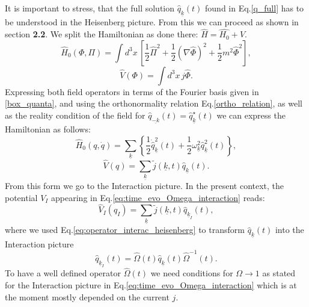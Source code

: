 \documentclass[12pt, titlepage]{article}
\begin{document}
It is important to stress, that the full solution $  \hat{q}_{\underline{k}}(t) 
 $ found in Eq.\enskip\eqref{q_full} has to be understood in the Heisenberg picture.
 From this we can proceed as shown in section \textbf{2.2}.  
We split the Hamiltonian as done there: $ \hat{H}= \hat{H_0} +V $. 
\begin{equation}
\hat{H}_{0}({\Phi},{\Pi})=
\int d^{3}x 
\,
\left[ 
\frac{1}{2}\hat{\Pi}^{2} + \frac{1}{2}(\nabla \hat{ \Phi})^{2} 
+\frac{1}{2}m^{2}\hat{\Phi}^{2}
\right] 
,
\end{equation}
\begin{equation}
\hat{V}(\Phi)=
\int d^{3}x 
\,
j\hat{\Phi}
.
\end{equation}
Expressing both field operators in terms of the Fourier basis given in \eqref{box_quanta}, and using the orthonormality relation Eq.\enskip\eqref{ortho_relation}, as well as the reality condition of the field for $ \hat{q}_{\underline{-k}}(t)=\hat{q}^{\star}_{\underline{k}}(t) $ we can express the Hamiltonian as follows:
\begin{equation}
\hat{H}_{0}({q},\dot{{q}})=
\sum_{\underline{k}}
\left\lbrace 
\frac{1}{2}\dot{\hat{q}}^{2}_{\underline{k}}(t)
+\frac{1}{2}\omega_{\underline{k}}^{2}\hat{q}^{2}_{\underline{k}}(t)
\right\rbrace 
,
\end{equation}
\begin{equation}
\hat{V}(q)=
\sum_{\underline{k}}
\tilde{j}(\underline{k},t)\hat{q}_{\underline{k}}(t).
\end{equation}
From this form we go to the Interaction picture. In the present context, the potential $ V_{I} $ appearing in Eq.\enskip\eqref{eq:time_evo_Omega_interaction} reads:
\begin{equation}
\hat{V}_{I}(q_{I})=
\sum_{\underline{k}}
\tilde{j}(\underline{k},t)\hat{q}_{\underline{k}_{I}}(t),
\end{equation}
where we used Eq.\enskip\eqref{eq:operator_interac_heisenberg} to transform $ \hat{q}_{\underline{k}}(t) $ into the Interaction picture
\begin{equation}
\hat{q}_{\underline{k}_{I}}(t)=
\hat{\Omega}(t)
\hat{q}_{\underline{k}}(t)
\hat{\Omega}^{-1}(t).
\end{equation}
To have a well defined operator $ \hat{\Omega}(t) $  we need conditions for $ \Omega \rightarrow 1 $ as stated for the Interaction picture in Eq.\enskip\eqref{eq:time_evo_Omega_interaction} which is at the moment mostly depended on the current $ j $.
%
%
%
%
\end{document}
